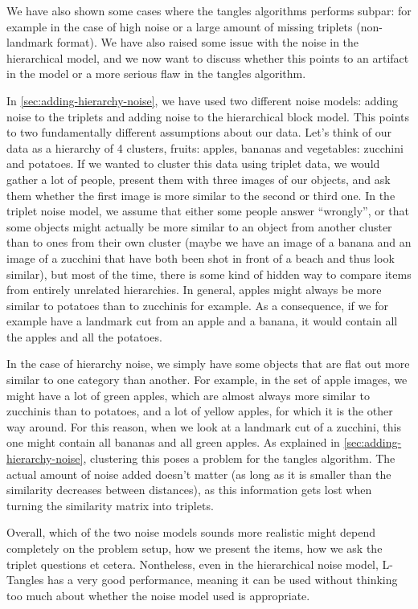 We have also shown some cases where the tangles algorithms performs subpar: for example in the case of high noise or a large amount of missing triplets (non-landmark format).
We have also raised some issue with the noise in the hierarchical model, and we now want to discuss whether this points to an artifact in the model or a more serious flaw in the tangles
algorithm.

In \autoref{sec:adding-hierarchy-noise}, we have used two different noise models: adding noise to the triplets and adding noise to the hierarchical block model. This points to two fundamentally different
assumptions about our data. Let's think of our data as a hierarchy of 4 clusters, fruits: apples, bananas and vegetables: zucchini and potatoes.
If we wanted to cluster this data using triplet data, we would gather a lot of people, present them with three images of our objects, and ask them whether the first image is more similar to the second or third one.
In the triplet noise model, we assume that either some people answer \enquote{wrongly}, or that some objects might actually be more similar to an object from another cluster than to ones
from their own cluster (maybe we have an image of a banana and an image of a zucchini that have both been shot in front of a beach and thus look similar), but most of the time, there is some kind of 
hidden way to compare items from entirely unrelated hierarchies. In general, apples might always be more similar to potatoes than to zucchinis for example. As a consequence, if we for example have a landmark
cut from an apple and a banana, it would contain all the apples and all the potatoes. 

In the case of hierarchy noise, we simply have some objects that are flat out more similar to one category than another. For example, in the set of apple images, we might have a lot of green apples, which 
are almost always more similar to zucchinis than to potatoes, and a lot of yellow apples, for which it is the other way around. For this reason, when we look at a landmark cut of a zucchini, this one
might contain all bananas and all green apples. As explained in \autoref{sec:adding-hierarchy-noise}, clustering this poses a problem for the tangles algorithm. The actual amount of noise added doesn't matter
(as long as it is smaller than the similarity decreases between distances),  as this information gets lost when turning the similarity matrix into triplets.

Overall, which of the two noise models sounds more realistic might depend completely on the problem setup, how we present the items, how we ask the triplet questions et cetera. Nontheless, even in the
hierarchical noise model, L-Tangles has a very good performance, meaning it can be used without thinking too much about whether the noise model used is appropriate.
